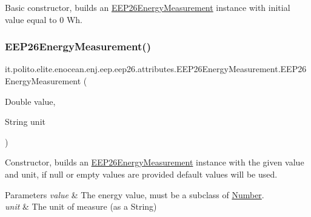 Basic constructor, builds an \hyperlink{classit_1_1polito_1_1elite_1_1enocean_1_1enj_1_1eep_1_1eep26_1_1attributes_1_1_e_e_p26_energy_measurement}{E\+E\+P26\+Energy\+Measurement} instance with initial value equal to 0 Wh. \hypertarget{classit_1_1polito_1_1elite_1_1enocean_1_1enj_1_1eep_1_1eep26_1_1attributes_1_1_e_e_p26_energy_measurement_a47d581cfced5c811a3cddcd11f3bbfbc}{}\label{classit_1_1polito_1_1elite_1_1enocean_1_1enj_1_1eep_1_1eep26_1_1attributes_1_1_e_e_p26_energy_measurement_a47d581cfced5c811a3cddcd11f3bbfbc} 
\subsubsection{\texorpdfstring{E\+E\+P26\+Energy\+Measurement()}{EEP26EnergyMeasurement()}\hspace{0.1cm}{\footnotesize\ttfamily [2/2]}}
{\footnotesize\ttfamily it.\+polito.\+elite.\+enocean.\+enj.\+eep.\+eep26.\+attributes.\+E\+E\+P26\+Energy\+Measurement.\+E\+E\+P26\+Energy\+Measurement (\begin{DoxyParamCaption}\item[{Double}]{value,  }\item[{String}]{unit }\end{DoxyParamCaption})}

Constructor, builds an \hyperlink{classit_1_1polito_1_1elite_1_1enocean_1_1enj_1_1eep_1_1eep26_1_1attributes_1_1_e_e_p26_energy_measurement}{E\+E\+P26\+Energy\+Measurement} instance with the given value and unit, if null or empty values are provided default values will be used.


\begin{DoxyParams}{Parameters}
{\em value} & The energy value, must be a subclass of \hyperlink{}{Number}. \\
\hline
{\em unit} & The unit of measure (as a String) \\
\hline
\end{DoxyParams}


